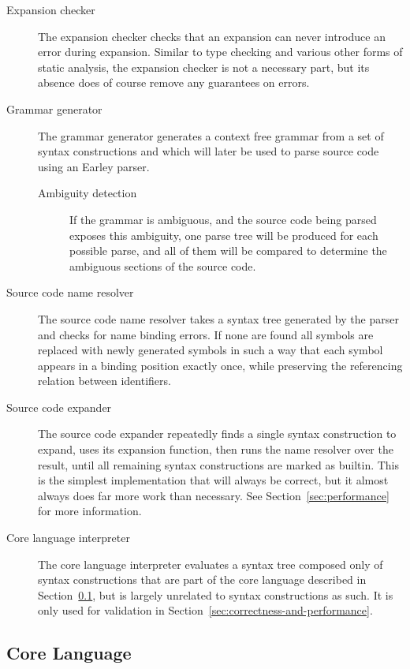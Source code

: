 \documentclass{kththesis}
\begin{document}
\begin{description}
  \item[Expansion checker] The expansion checker checks that an expansion can never introduce an error during expansion. Similar to type checking and various other forms of static analysis, the expansion checker is not a necessary part, but its absence does of course remove any guarantees on errors.

  \item[Grammar generator] The grammar generator generates a context free grammar from a set of syntax constructions and which will later be used to parse source code using an Earley \cite{Earley1970An-Efficient-Co} parser.
  \begin{description}
    \item[Ambiguity detection] If the grammar is ambiguous, and the source code being parsed exposes this ambiguity, one parse tree will be produced for each possible parse, and all of them will be compared to determine the ambiguous sections of the source code.
  \end{description}

  \item[Source code name resolver] The source code name resolver takes a syntax tree generated by the parser and checks for name binding errors. If none are found all symbols are replaced with newly generated symbols in such a way that each symbol appears in a binding position exactly once, while preserving the referencing relation between identifiers.

  \item[Source code expander] The source code expander repeatedly finds a single syntax construction to expand, uses its expansion function, then runs the name resolver over the result, until all remaining syntax constructions are marked as builtin. This is the simplest implementation that will always be correct, but it almost always does far more work than necessary. See Section~\ref{sec:performance} for more information.

  \item[Core language interpreter] The core language interpreter evaluates a syntax tree composed only of syntax constructions that are part of the core language described in Section~\ref{sec:core-language}, but is largely unrelated to syntax constructions as such. It is only used for validation in Section~\ref{sec:correctness-and-performance}.
\end{description}

\subsection{Core Language} \label{sec:core-language}
\end{document}
